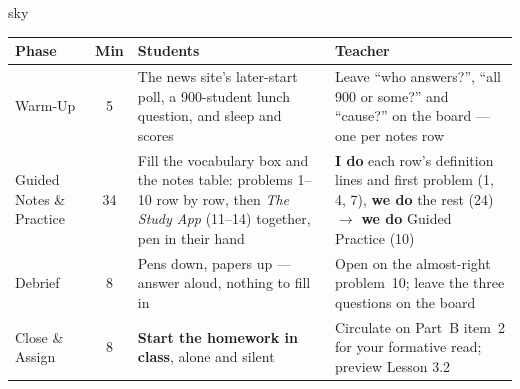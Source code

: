\documentclass[10pt]{article}
\begin{document}
\boxguard[30]
\begin{skillbox}{sky}
\renewcommand{\arraystretch}{1.25}
\begin{tabularx}{\linewidth}{@{}l c X X@{}}
\textbf{Phase} & \textbf{Min} & \textbf{Students} & \textbf{Teacher} \\
\hline
Warm-Up & 5 & The news site's later-start poll, a 900-student lunch question, and sleep and
scores & Leave ``who answers?'', ``all 900 or some?'' and ``cause?'' on the board --- one per
notes row \\
Guided Notes \& Practice & 34 & Fill the vocabulary box and the notes table: problems 1--10 row
by row, then \emph{The Study App} (11--14) together, pen in their hand & \textbf{I do}
each row's definition lines and first problem (1, 4, 7), \textbf{we do} the rest (24)
$\to$ \textbf{we do} Guided Practice (10) \\
Debrief & 8 & Pens down, papers up --- answer aloud, nothing to fill in & Open on the
almost-right problem~10; leave the three questions on the board \\
Close \& Assign & 8 & \textbf{Start the homework in class}, alone and silent & Circulate on
Part~B item~2 for your formative read; preview Lesson 3.2 \\
\end{tabularx}
\end{skillbox}
\end{document}
